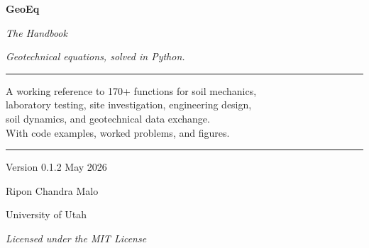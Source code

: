 \documentclass[11pt,a4paper,openany]{book}
\begin{document}
\begin{titlepage}
\centering
\vspace*{1.6cm}

{\sffamily\fontsize{72}{84}\selectfont\color{geoBlue}\textbf{GeoEq}\par}
\vspace{0.6cm}
{\sffamily\LARGE\color{geoBlue!70!black}\itshape The Handbook\par}
\vspace{0.3cm}
{\Large\itshape Geotechnical equations, solved in Python.\par}

\vspace{2.6cm}
\rule{\textwidth}{1pt}
\vspace{0.4cm}

{\Large A working reference to 170+ functions for soil mechanics,\\[4pt]
laboratory testing, site investigation, engineering design,\\[4pt]
soil dynamics, and geotechnical data exchange.\\[10pt]
With code examples, worked problems, and figures.\par}

\vspace{0.4cm}
\rule{\textwidth}{1pt}

\vfill

{\large Version 0.1.2 \quad\textbar\quad May 2026\par}
\vspace{0.5cm}
{\large Ripon Chandra Malo\par}
{\small University of Utah\par}
\vspace{1cm}
{\small\itshape Licensed under the MIT License\par}
\end{titlepage}
\end{document}
